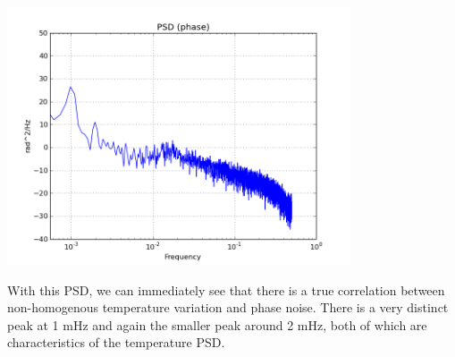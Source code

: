 \documentclass[11 pt]{article}
\begin{document}
\begin{center}\includegraphics[width=4in]{PSD_phasemod.png}\\\end{center}
With this PSD, we can immediately see that there is a true correlation between non-homogenous temperature variation and phase noise. There is a very distinct peak at 1 mHz and again the smaller peak around 2 mHz, both of which are characteristics of the temperature PSD.
\end{document}
